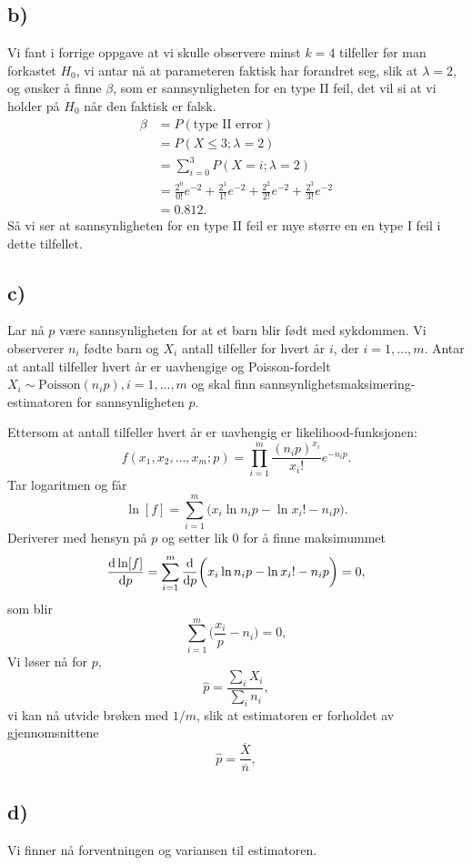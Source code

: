 \documentclass[a4paper, 11pt, titlepage, english]{article}
\renewcommand{\d}{{\rm d}}
\begin{document}
\subsection*{b)}
Vi fant i forrige oppgave at vi skulle observere minst $k=4$ tilfeller før man forkastet $H_0$, vi antar nå at parameteren faktisk har forandret seg, slik at $\lambda = 2$, og ønsker å finne $\beta$, som er sannsynligheten for en type II feil, det vil si at vi holder på $H_0$ når den faktisk er falsk.
\begin{align*}
\beta &= P(\mbox{type II error}) \\
&= P(X\leq3; \lambda=2) \\
&= \sum_{i=0}^3 P(X=i; \lambda=2)\\
&= \frac{2^0}{0!}e^{-2} + \frac{2^1}{1!}e^{-2} + \frac{2^2}{2!}e^{-2} + \frac{2^3}{3!}e^{-2}\\
&= 0.812.
\end{align*}
Så vi ser at sannsynligheten for en type II feil er mye større en en type I feil i dette tilfellet.

\subsection*{c)}
Lar nå $p$ være sannsynligheten for at et barn blir født med sykdommen. Vi observerer $n_i$ fødte barn og $X_i$ antall tilfeller for hvert år $i$, der $i=1,\ldots,m$. Antar at antall tilfeller hvert år er uavhengige og Poisson-fordelt $X_i \sim \mbox{Poisson}(n_ip), i = 1,\ldots,m$ og skal finn sannsynlighetsmaksimering-estimatoren for sannsynligheten $p$.

Ettersom at antall tilfeller hvert år er uavhengig er likelihood-funksjonen:
$$f(x_1, x_2, \ldots, x_m; p) = \prod_{i=1}^m \frac{(n_ip)^{x_i}}{x_i!}e^{-n_i p}.$$
Tar logaritmen og får
$$\ln[f] = \sum_{i=1}^m \bigg(x_i \ln n_i p - \ln x_i! - n_i p\bigg).$$
Deriverer med hensyn på $p$ og setter lik 0 for å finne maksimummet
$$\frac{\d \ln[f]}{\d p} = \sum_{i=1}^m \frac{\d}{\d p}\bigg(x_i \ln n_i p - \ln x_i! - n_i p\bigg) = 0,$$
som blir
$$\sum_{i=1}^m \bigg(\frac{x_i}{p}  - n_i \bigg) = 0,$$
Vi løser nå for $p$, 
$$\hat{p} = \frac{\sum_i X_i}{\sum_i n_i},$$
vi kan nå utvide brøken med $1/m$, slik at estimatoren er forholdet av gjennomsnittene
$$\hat{p} = \frac{\overline{X}}{\overline{n}},$$

\clearpage

\subsection*{d)}
Vi finner nå forventningen og variansen til estimatoren.
\end{document}

